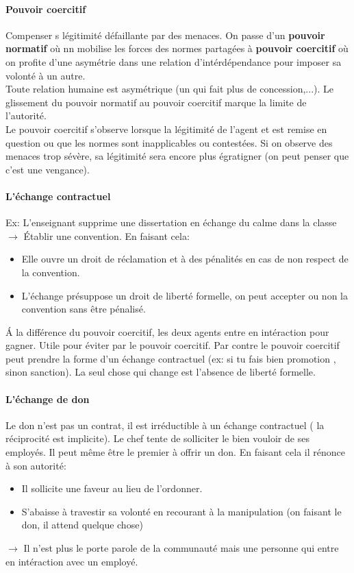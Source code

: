 \documentclass[11pt]{article} %
\begin{document}
	\paragraph{Pouvoir coercitif} Compenser s légitimité défaillante par des menaces. On passe d'un 	
	\textbf{pouvoir normatif} où nn mobilise les forces des normes partagées à \textbf{pouvoir coercitif}
	où on profite d'une asymétrie dans une relation d'intérdépendance pour imposer sa volonté à un autre.\\
	Toute relation humaine est asymétrique (un qui fait plus de concession,...). Le glissement du pouvoir 
	normatif au pouvoir coercitif marque la limite de l'autorité.\\
	Le pouvoir coercitif s'observe lorsque la légitimité de l'agent et est remise en question ou que les normes
	sont inapplicables ou contestées. Si on observe des menaces trop sévère, sa légitimité sera encore plus 
	égratigner (on peut penser que c'est une vengance).
	\paragraph{L'échange contractuel} Ex: L'enseignant supprime une dissertation en échange du calme 
	dans la classe $\to$ Établir une convention. En faisant cela:
	\begin{itemize}
		\item Elle ouvre un droit de réclamation et à des pénalités en cas de non respect de la convention.
		\item L'échange présuppose un droit de liberté formelle, on peut accepter ou non la convention sans
		être pénalisé.
	\end{itemize}
	Á la différence du pouvoir coercitif, les deux agents entre en intéraction pour gagner. Utile pour éviter par
	le pouvoir coercitif. Par contre le pouvoir coercitif peut prendre la forme d'un échange contractuel (ex:
	si tu fais bien promotion , sinon sanction). La seul chose qui change est l'absence de liberté formelle.
	\paragraph{L'échange de don} Le don n'est pas un contrat, il est irréductible à un échange contractuel (
	la réciprocité est implicite). Le chef tente de solliciter le bien vouloir de ses employés. Il peut même
	être le premier à offrir un don. En faisant cela il rénonce à son autorité:
	\begin{itemize}
		\item Il sollicite une faveur au lieu de l'ordonner.
		\item S'abaisse à travestir sa volonté en recourant à la manipulation (on faisant le don, il attend 
		quelque chose)
	\end{itemize}
	$\to$ Il n'est plus le porte parole de la communauté mais une personne qui entre en intéraction avec un
	employé.
\end{document}
